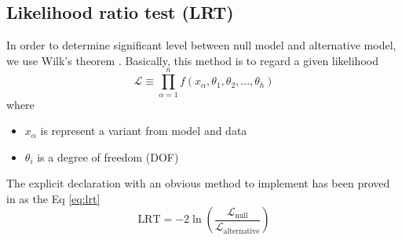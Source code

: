 \subsection{Likelihood ratio test (LRT)}
In order to determine significant level between null model and alternative model, we use Wilk's theorem \cite{Wilks1938}.
Basically, this method is to regard a given likelihood
\begin{equation}
    \mathcal{L} \equiv \prod_{\alpha=1}^n f(x_\alpha, \theta_1, \theta_2, ..., \theta_h)
\end{equation}
where 
\begin{itemize}
    \item $x_\alpha$ is represent a variant from model and data
    \item $\theta_i$ is a degree of freedom (DOF)
\end{itemize}
The explicit declaration with an obvious method to implement has been proved in \cite{Huelsenbeck} as the Eq \ref{eq:lrt}
\begin{equation}
    \text{LRT} = -2\ln\left(\frac{\mathcal{L}_\text{null}}{\mathcal{L}_\text{alternative}}\right)
    \label{eq:lrt}
\end{equation}